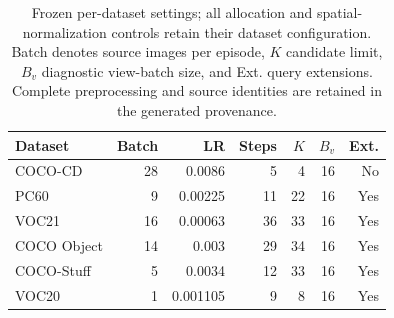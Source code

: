 \begin{table}[t]
\caption{Frozen per-dataset settings; all allocation and spatial-normalization controls retain their dataset configuration. Batch denotes source images per episode, $K$ candidate limit, $B_v$ diagnostic view-batch size, and Ext. query extensions. Complete preprocessing and source identities are retained in the generated provenance.}
\label{tab:configurations}
\centering\small
\begin{tabular}{@{}lrrrrrr@{}}
\toprule
Dataset & Batch & LR & Steps & $K$ & $B_v$ & Ext. \\
\midrule
COCO-CD & 28 & 0.0086 & 5 & 4 & 16 & No \\
PC60 & 9 & 0.00225 & 11 & 22 & 16 & Yes \\
VOC21 & 16 & 0.00063 & 36 & 33 & 16 & Yes \\
COCO Object & 14 & 0.003 & 29 & 34 & 16 & Yes \\
COCO-Stuff & 5 & 0.0034 & 12 & 33 & 16 & Yes \\
VOC20 & 1 & 0.001105 & 9 & 8 & 16 & Yes \\
\bottomrule
\end{tabular}
\end{table}
